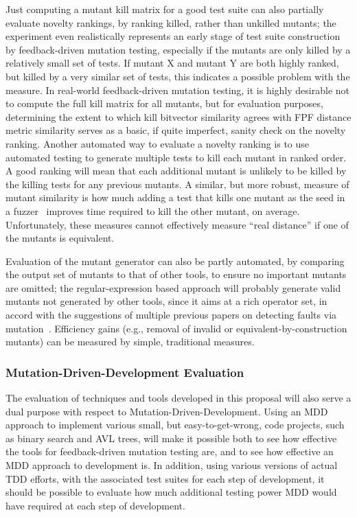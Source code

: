 Just computing a mutant kill matrix for a good test suite can also
partially evaluate novelty rankings, by ranking
killed, rather than unkilled mutants; the experiment even
realistically represents an early stage of test suite construction by
feedback-driven mutation testing, especially if the mutants are only
killed by a relatively small set of tests.  If
mutant X and mutant Y are both highly ranked, but killed by a very
similar set of tests, this indicates a possible problem with the
measure.  In real-world feedback-driven mutation testing, it is highly
desirable not to compute the full kill matrix for all mutants, but
for evaluation purposes, determining the extent to which kill
bitvector similarity agrees with FPF distance metric similarity serves
as a basic, if quite imperfect, sanity check on the novelty ranking.
Another automated way to evaluate a novelty ranking is to use automated
testing to generate multiple tests to kill each mutant in ranked order.  A good ranking will mean
that each additional mutant is unlikely to be killed by the killing
tests for any previous mutants.  A similar, but more robust, measure of mutant similarity
is how much adding a test that kills one mutant as the seed in a
fuzzer~\cite{aflfuzz,libfuzzer} improves time required to kill the other
mutant, on average.  Unfortunately, these measures cannot effectively
measure ``real distance'' if one of the mutants is equivalent.

Evaluation of the mutant generator can also be partly automated, by
comparing the output set of mutants to that of other tools, to ensure
no important mutants are omitted; the regular-expression based
approach will probably generate valid mutants not generated by other
tools, since it aims at a rich operator set, in accord with the
suggestions of multiple previous papers on detecting faults via
mutation~\cite{just2014mutants,gopinath2017mutation}.  Efficiency
gains (e.g., removal of invalid or equivalent-by-construction mutants) can
be measured by simple, traditional measures.

\subsubsection{Mutation-Driven-Development Evaluation}
\label{sec:mevalplan}

The evaluation of techniques and tools developed in this proposal will
also serve a dual purpose with respect to
Mutation-Driven-Development.  Using an MDD approach to implement
various small, but easy-to-get-wrong, code projects, such as binary
search and AVL trees, will make it possible both to see how effective
the tools for feedback-driven mutation testing are, and to see how effective an MDD approach to development is.  In
addition, using various versions of actual TDD efforts, with the
associated test suites for each step of development, it should be
possible to evaluate how much additional testing power MDD would have
required at each step of development.